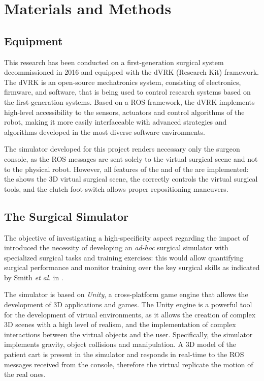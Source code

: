 \documentclass[../main.tex]{subfiles}
\begin{document}
\chapter{Materials and Methods}

\section{Equipment}
This research has been conducted on a first-generation \davinci surgical system decommissioned in 2016 and equipped with the dVRK (\davinci Research Kit) framework. The dVRK \cite{Kazanzides2014} is an open-source mechatronics system, consisting of electronics, firmware, and software, that is being used to control research systems based on the first-generation \davinci systems. Based on a ROS \cite{Quigley2009} framework, the dVRK implements high-level accessibility to the sensors, actuators and control algorithms of the \davinci robot, making it more easily interfaceable with advanced strategies and algorithms developed in the most diverse software environments.

The simulator developed for this project renders necessary only the surgeon console, as the ROS messages are sent solely to the virtual surgical scene and not to the physical robot. However, all features of the \psms and of the \ecm are implemented: the \hrsv shows the 3D virtual surgical scene, the \mtms correctly controls the virtual surgical tools, and the clutch foot-switch allows proper repositioning maneuvers. 

\section{The Surgical Simulator} 
The objective of investigating a high-specificity aspect regarding the impact of \vfs introduced the necessity of developing an \textit{ad-hoc} surgical simulator with specialized surgical tasks and training exercises: this would allow quantifying surgical performance and monitor training over the key surgical skills as indicated by Smith \textit{et al.} in \cite{Smith2014}. 

The simulator is based on \textit{Unity}, a cross-platform game engine that allows the development of 3D applications and games. The Unity engine is a powerful tool for the development of virtual environments, as it allows the creation of complex 3D scenes with a high level of realism, and the implementation of complex interactions between the virtual objects and the user. Specifically, the simulator implements gravity, object collisions and manipulation. A 3D model of the \davinci patient cart is present in the simulator and responds in real-time to the ROS messages received from the console, therefore the virtual \psms replicate the motion of the real ones. 
\end{document}

